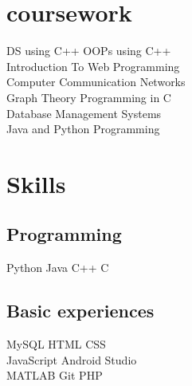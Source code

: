\documentclass[]{deedy-resume-openfont}
\begin{document}
\begin{minipage}[t]{0.33\textwidth}


\section{coursework}


\textbullet{} DS using C++
\textbullet{} OOPs using C++\\
\textbullet{} Introduction To Web Programming \\
\textbullet{} Computer Communication Networks \\
\textbullet{} Graph Theory
\textbullet{} Programming in C\\
\textbullet{} Database Management Systems\\
\textbullet{} Java and Python Programming


\sectionsep



\section{Skills}
\subsection{Programming}
\textbullet{}Python \textbullet{} Java \textbullet{}   C++ \textbullet{} C\\
\sectionsep

\subsection{Basic experiences}
 \textbullet{} MySQL \textbullet{} HTML \textbullet{} CSS\\ \textbullet{} JavaScript  \textbullet{} Android Studio  \\  \textbullet{} MATLAB   \textbullet{} Git \textbullet{} PHP \\
 

\end{minipage}
\end{document}
